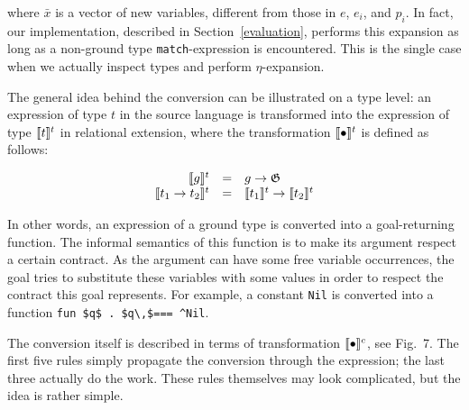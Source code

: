 \noindent where $\bar{x}$ is a vector of new variables, different from those in $e$, $e_i$, and $p_i$. In fact, our implementation,
described in Section~\ref{evaluation}, performs this expansion as long as a non-ground type \lstinline|match|-expression is encountered. 
This is the single case when we actually inspect types and perform $\eta$-expansion.

The general idea behind the conversion can be illustrated on a type level: an expression of type $t$ in the source
language is transformed into the expression of type $\llbracket{t}\rrbracket^t$ in relational extension, where
the transformation $\llbracket{\bullet}\rrbracket^t$ is defined as follows:

$$
\begin{array}{rcl}
\llbracket{g}\rrbracket^t                     & = & g \to \mathfrak G \\
\llbracket{t_1 \to t_2}\rrbracket^t           & = & \llbracket{t_1}\rrbracket^t \to \llbracket{t_2}\rrbracket^t \\
\end{array}
$$

In other words, an expression of a ground type is converted into a goal-returning function. The informal semantics
of this function is to make its argument respect a certain contract. As the argument can have some free variable occurrences, 
the goal tries to substitute these variables with some values in order to respect the contract this goal represents. 
For example, a constant \lstinline|Nil| is converted into a function \lstinline|fun $q$ . $q\,$=== ^Nil|.

The conversion itself is described in terms of transformation $\llbracket{\bullet}\rrbracket^c$, see Fig.~7. %
The first five rules
simply propagate the conversion through the expression; the last three actually do the work. These rules themselves may look complicated,
but the idea is rather simple.


